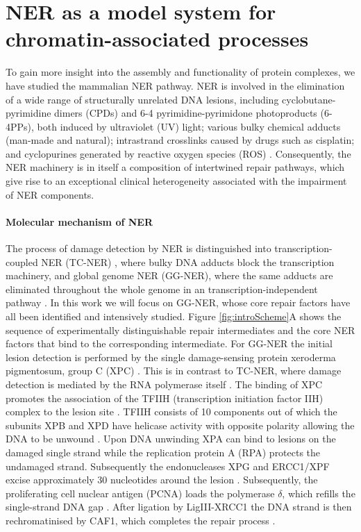 \section{NER as a model system for chromatin-associated processes}
\label{sec:NERexperiments}
To gain more insight into the assembly and functionality of protein complexes, we have studied the mammalian NER pathway. NER is involved in the elimination of a wide range of structurally unrelated DNA lesions, including cyclobutane-pyrimidine dimers (CPDs) and 6-4 pyrimidine-pyrimidone photoproducts (6-4PPs), both induced by ultraviolet (UV) light; various bulky chemical adducts (man-made and natural); intrastrand crosslinks caused by drugs such as cisplatin; and cyclopurines generated by reactive oxygen species (ROS) \cite{Marteijn2014}. Consequently, the NER machinery is in itself a composition of intertwined repair pathways, which give rise to an exceptional clinical heterogeneity associated with the impairment of NER components. 


\paragraph{Molecular mechanism of NER}
\label{sec:NERmechanism}
The process of damage detection by NER is distinguished into transcription-coupled NER (TC-NER) \cite{Sugasawa:2005:Cell:15882621,Gillet:2006:Chem-Rev:16464005}, where bulky DNA adducts block the transcription machinery, and global genome NER (GG-NER), where the same adducts are eliminated throughout the whole genome in an transcription-independent pathway \cite{Fousteri2008}. In this work we will focus on GG-NER, whose core repair factors have all been identified and intensively studied. Figure \ref{fig:introScheme}A shows the sequence of experimentally distinguishable repair intermediates and the core NER factors that bind to the corresponding intermediate. For GG-NER the initial lesion detection is performed by the single damage-sensing protein xeroderma pigmentosum, group C (XPC) \cite{Sugasawa:1998:Mol-Cell:9734359,Volker2001}. This is in contrast to TC-NER, where damage detection is mediated by the RNA polymerase itself \cite{Hanawalt2008}. The binding of XPC promotes the association of the TFIIH (transcription initiation factor IIH) complex to the lesion site \cite{Yokoi:2000:J-Biol-Chem:10734143,Riedl2003,Volker2001}. TFIIH consists of 10 components out of which the subunits XPB and XPD have helicase activity with opposite polarity allowing the DNA to be unwound \cite{Tapias2004,Compe2012}. Upon DNA unwinding XPA can bind to lesions on the damaged single strand while the replication protein A (RPA) protects the undamaged strand. Subsequently the endonucleases XPG and ERCC1/XPF excise approximately 30 nucleotides around the lesion \cite{Evans1997,deLaat:1998:Genes-Dev:9716411,Wakasugi:1997:J-Biol-Chem:9188507,Park:2006:FEBS-J:16623697,Camenisch:2006:Nat-Struct-Mol-Biol:16491090}. Subsequently, the proliferating cell nuclear antigen (PCNA) loads the polymerase $\delta$, which refills the single-strand DNA gap \cite{Hoeijmakers:2001:Nature:11357144,Essers2005,Moser:2007:Mol-Cell:17643379}. After ligation by LigIII-XRCC1 the DNA strand is then rechromatinised by CAF1, which completes the repair process \cite{Green:2003:EMBO-J:14517254,Polo2006} . 


